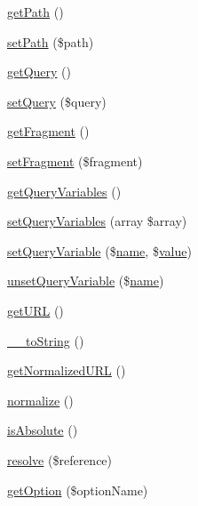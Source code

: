 \begin{DoxyCompactItemize}
\item 
\hyperlink{classNet__URL2_a1c14da4e4da398c69ab0efcc80b183d2}{get\+Path} ()
\item 
\hyperlink{classNet__URL2_aa893e3c250be4842cf21dc6aed0f46b0}{set\+Path} (\$path)
\item 
\hyperlink{classNet__URL2_ab65997a75dae3ef237c80b57da4467f6}{get\+Query} ()
\item 
\hyperlink{classNet__URL2_a8ef0c4583fcbc47e980f5facadc96295}{set\+Query} (\$query)
\item 
\hyperlink{classNet__URL2_a4a72ed5275b63c5cc600a74ec33aa76c}{get\+Fragment} ()
\item 
\hyperlink{classNet__URL2_ac2b9fbed981333efd7cab6c42e47bc04}{set\+Fragment} (\$fragment)
\item 
\hyperlink{classNet__URL2_a92231f88e82f0551c1958af40f7cb88d}{get\+Query\+Variables} ()
\item 
\hyperlink{classNet__URL2_a2b93dbf912e578998c7447788400cc07}{set\+Query\+Variables} (array \$array)
\item 
\hyperlink{classNet__URL2_a30d2d35e20ee1391db08c5ab74ffb262}{set\+Query\+Variable} (\$\hyperlink{common_8js_a22c29d2aa8ed6161ce8faa718ef76e68}{name}, \$\hyperlink{jquery_8js_abe5393d870043cf6aaa1d5ad5fce755c}{value})
\item 
\hyperlink{classNet__URL2_a2841fc0817045ec33688490613d6e64c}{unset\+Query\+Variable} (\$\hyperlink{common_8js_a22c29d2aa8ed6161ce8faa718ef76e68}{name})
\item 
\hyperlink{classNet__URL2_a77d3197589861087e09db160a78c7ee1}{get\+U\+RL} ()
\item 
\hyperlink{classNet__URL2_ad3c022a53765e85dfc5b0cab01a09e03}{\+\_\+\+\_\+to\+String} ()
\item 
\hyperlink{classNet__URL2_ad52ea9577f6cf9ecc712e29498b686d4}{get\+Normalized\+U\+RL} ()
\item 
\hyperlink{classNet__URL2_a1bde4a2650383694a88eb2f1f061fbc4}{normalize} ()
\item 
\hyperlink{classNet__URL2_adfb0cbaed0f947990271d8df410854e2}{is\+Absolute} ()
\item 
\hyperlink{classNet__URL2_a8630ab79fad624b2fd5b0df2e9123c0a}{resolve} (\$reference)
\item 
\hyperlink{classNet__URL2_a4da2891e3eac1700940ae6cf483a0dd3}{get\+Option} (\$option\+Name)
\end{DoxyCompactItemize}
